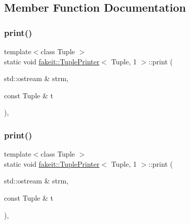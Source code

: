 \subsection{Member Function Documentation}
\mbox{\label{structfakeit_1_1TuplePrinter_3_01Tuple_00_011_01_4_adf9fadff296532b4a997e6d76dae23bb}} 
\subsubsection{\texorpdfstring{print()}{print()}\hspace{0.1cm}{\footnotesize\ttfamily [1/9]}}
{\footnotesize\ttfamily template$<$class Tuple $>$ \\
static void \mbox{\hyperlink{structfakeit_1_1TuplePrinter}{fakeit\+::\+Tuple\+Printer}}$<$ Tuple, 1 $>$\+::print (\begin{DoxyParamCaption}\item[{std\+::ostream \&}]{strm,  }\item[{const Tuple \&}]{t }\end{DoxyParamCaption})\hspace{0.3cm}{\ttfamily [inline]}, {\ttfamily [static]}}

\mbox{\label{structfakeit_1_1TuplePrinter_3_01Tuple_00_011_01_4_adf9fadff296532b4a997e6d76dae23bb}} 
\subsubsection{\texorpdfstring{print()}{print()}\hspace{0.1cm}{\footnotesize\ttfamily [2/9]}}
{\footnotesize\ttfamily template$<$class Tuple $>$ \\
static void \mbox{\hyperlink{structfakeit_1_1TuplePrinter}{fakeit\+::\+Tuple\+Printer}}$<$ Tuple, 1 $>$\+::print (\begin{DoxyParamCaption}\item[{std\+::ostream \&}]{strm,  }\item[{const Tuple \&}]{t }\end{DoxyParamCaption})\hspace{0.3cm}{\ttfamily [inline]}, {\ttfamily [static]}}

